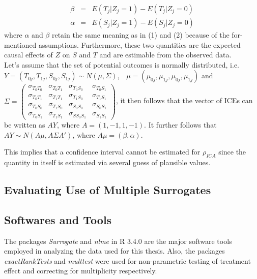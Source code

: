 \documentclass[a4paper,12pt]{article}
\begin{document}
	\begin{eqnarray}
	\beta &=& E(T_j|Z_j=1) - E(T_{j}|Z_j=0)\\
	\alpha &=& E(S_j|Z_j=1) - E(S_{j}|Z_j=0)
	\end{eqnarray}
	where $\alpha$ and $\beta$ retain the same meaning as in (1) and (2) because of the for-mentioned assumptions\citep{surrogate3,wim2016}. Furthermore, these two quantities are the expected causal effects of $Z$ on $S$ and $T$\citep{surrogate1} and are estimable from the observed data.\\ 
	
	Let's assume that the set of potential outcomes is normally distributed, i.e. $Y = (T_{0j},T_{1j},S_{0j},S_{1j}) \sim N(\mu, \Sigma)$,\ \  $\mu = (\mu_{0j},\mu_{1j},\mu_{0j},\mu_{1j})$ and $\Sigma = \left( \begin{array}{cccc}
	\sigma_{T_0 T_0} & \sigma_{T_0 T_1} & \sigma_{T_0 S_0} & \sigma_{T_0 S_1}\\
	\sigma_{T_0 T_1} & \sigma_{T_1 T_1} & \sigma_{T_1 S_0} & \sigma_{T_1 S_1}\\
	\sigma_{T_0 S_0} & \sigma_{T_1 S_0} & \sigma_{S_0 S_0} & \sigma_{S_0 S_1}\\
	\sigma_{T_0 S_1} & \sigma_{T_1 S_1} & \sigma_{SS_0 S_1} & \sigma_{S_1 S_1}
	\end{array} \right)$, it then follows that the vector of ICEs can be written as $AY$, where $A = (1, -1, 1, -1)$. It further follows that $AY \sim N(A \mu, A \Sigma A')$, where $A \mu = (\beta, \alpha)$\citep{surrogate1}. 
	
	This implies that a confidence interval cannot be estimated for $\rho_{ICA}$ since the quantity in itself is estimated via several guess of plausible values.
	
	\subsection{Evaluating Use of Multiple Surrogates}
	
	\subsection{Softwares and Tools}
	The packages \emph{Surrogate}\citep{R2} and \emph{nlme}\citep{R3} in R 3.4.0\citep{R} are the major software tools employed in analyzing the data used for this thesis. Also, the packages \emph{exactRankTests}\citep{R4} and \emph{multtest}\citep{R5} were used for non-parametric testing of treatment effect and correcting for multiplicity respectively.
	
\end{document}
